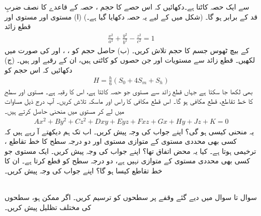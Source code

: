 سے ایک حصہ کاٹتا ہے۔دکھائیں کہ اس حصے  کا حجم  ، حصہ کے قاعدے  کا نصف ضربِ قد کے برابر ہو گا۔ (شکل  میں  کے لیے یہ حصہ دکھایا گیا ہے۔)
(ا) مستوی   اور مستوی  اور قطع زائد
\begin{align*}
\frac{x^2}{a^2}+\frac{y^2}{b^2}-\frac{z^2}{c^2}=1
\end{align*}
کے بیچ  ٹھوس جسم کا حجم تلاش کریں۔ (ب)  حاصل حجم کو ،  ،  اور   کی صورت میں لکھیں۔  قطع زائد سے مستویات   اور   جن حصوں کو کاٹتی  ہیں، ان کے رقبے  اور  ہیں۔ (ج) دکھائیں کہ اس حجم کو
\begin{align*}
H=\frac{h}{6}(S_0+4S_m+S_h)
\end{align*}
بھی لکھا جا سکتا ہے جہاں قطع زائد سے مستوی     جو حصہ کاٹتا ہے، اس کا رقبہ  ہے۔
مستوی     اور سطح  کا خط تقاطع،  قطع مکافی ہو گا۔ اس قطع مکافی کا راس اور ماسکہ  تلاش کریں۔
آپ درج ذیل مساوات میں  لے کر مستوی  میں منحنی حاصل کرتے ہیں۔
\begin{align*}
Ax^2+By^2+Cz^2+Dxy+Eyz+Fxz+Gx+Hy+Jz+K=0
\end{align*}
یہ منحنی کیسی ہو گی؟ اپنے جواب کی وجہ پیش کریں۔
اب  تک  ہم دیکھتے آ رہے ہیں کہ کسی بھی محددی  مستوی  کے متوازی مستوی  اور دو درجہ سطح کا خط تقاطع ،  ترخیمی ہوتا ہے۔ کیا یہ محض    اتفاق تھا؟ اپنے جواب  کی وجہ پیش کریں۔
ایک مستوی  جو کسی بھی محددی  مستوی کے متوازی نہیں ہے، دو درجہ سطح کو قطع کرتا ہے۔  ان کا خط تقاطع کیسا ہو گا؟ اپنے جواب کی وجہ پیش کریں۔

\\
سوال  تا سوال  میں دیے گئے وقفے پر سطحوں کو ترسیم کریں۔ اگر ممکن ہو، سطحوں کی  مختلف تظلیل پیش کریں۔

